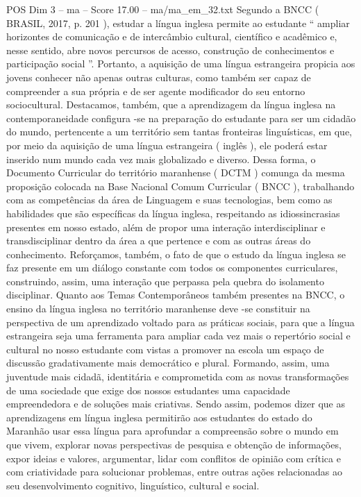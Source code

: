 \begin{textsample}{POS Dim 3 – ma – Score 17.00 – ma/ma\_em\_32.txt}
Segundo a BNCC ( BRASIL, 2017, p. 201 ), estudar a língua inglesa permite ao estudante “ ampliar horizontes de comunicação e de intercâmbio cultural, científico e acadêmico e, nesse sentido, abre novos percursos de acesso, construção de conhecimentos e participação social ”.
Portanto, a aquisição de uma língua estrangeira propicia aos jovens conhecer não apenas outras culturas, como também ser capaz de compreender a sua própria e de ser agente modificador do seu entorno sociocultural.
Destacamos, também, que a aprendizagem da língua inglesa na contemporaneidade configura -se na preparação do estudante para ser um cidadão do mundo, pertencente a um território sem tantas fronteiras linguísticas, em que, por meio da aquisição de uma língua estrangeira ( inglês ), ele poderá estar inserido num mundo cada vez mais globalizado e diverso.
Dessa forma, o Documento Curricular do território maranhense ( DCTM ) comunga da mesma proposição colocada na Base Nacional Comum Curricular ( BNCC ), trabalhando com as competências da área de Linguagem e suas tecnologias, bem como as habilidades que são específicas da língua inglesa, respeitando as idiossincrasias presentes em nosso estado, além de propor uma interação interdisciplinar e transdisciplinar dentro da área a que pertence e com as outras áreas do conhecimento.
Reforçamos, também, o fato de que o estudo da língua inglesa se faz presente em um diálogo constante com todos os componentes curriculares, construindo, assim, uma interação que perpassa pela quebra do isolamento disciplinar.
Quanto aos Temas Contemporâneos também presentes na BNCC, o ensino da língua inglesa no território maranhense deve -se constituir na perspectiva de um aprendizado voltado para as práticas sociais, para que a língua estrangeira seja uma ferramenta para ampliar cada vez mais o repertório social e cultural no nosso estudante com vistas a promover na escola um espaço de discussão gradativamente mais democrático e plural.
Formando, assim, uma juventude mais cidadã, identitária e comprometida com as novas transformações de uma sociedade que exige dos nossos estudantes uma capacidade empreendedora e de soluções mais criativas.
Sendo assim, podemos dizer que as aprendizagens em língua inglesa permitirão aos estudantes do estado do Maranhão usar essa língua para aprofundar a compreensão sobre o mundo em que vivem, explorar novas perspectivas de pesquisa e obtenção de informações, expor ideias e valores, argumentar, lidar com conflitos de opinião com crítica e com criatividade para solucionar problemas, entre outras ações relacionadas ao seu desenvolvimento cognitivo, linguístico, cultural e social.

\end{textsample}
